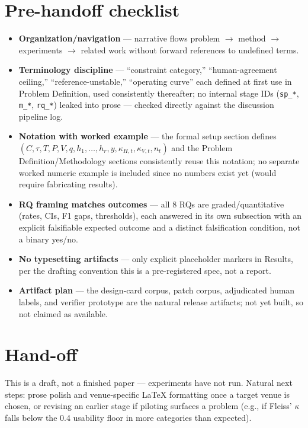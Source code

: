 \documentclass[11pt]{article}
\begin{document}
\section*{Pre-handoff checklist}
\begin{itemize}[leftmargin=1.4em]
\item \textbf{Organization/navigation} --- narrative flows problem $\to$ method $\to$ experiments $\to$ related work without forward references to undefined terms.
\item \textbf{Terminology discipline} --- ``constraint category,'' ``human-agreement ceiling,'' ``reference-unstable,'' ``operating curve'' each defined at first use in Problem Definition, used consistently thereafter; no internal stage IDs (\texttt{sp\_*}, \texttt{m\_*}, \texttt{rq\_*}) leaked into prose --- checked directly against the discussion pipeline log.
\item \textbf{Notation with worked example} --- the formal setup section defines $(C, \tau, T, P, V, q, h_1,\dots,h_r, y, \kappa_{H,t}, \kappa_{V,t}, n_t)$ and the Problem Definition/Methodology sections consistently reuse this notation; no separate worked numeric example is included since no numbers exist yet (would require fabricating results).
\item \textbf{RQ framing matches outcomes} --- all 8 RQs are graded/quantitative (rates, CIs, F1 gaps, thresholds), each answered in its own subsection with an explicit falsifiable expected outcome and a distinct falsification condition, not a binary yes/no.
\item \textbf{No typesetting artifacts} --- only explicit placeholder markers in Results, per the drafting convention this is a pre-registered spec, not a report.
\item \textbf{Artifact plan} --- the design-card corpus, patch corpus, adjudicated human labels, and verifier prototype are the natural release artifacts; not yet built, so not claimed as available.
\end{itemize}

\section*{Hand-off}
This is a draft, not a finished paper --- experiments have not run. Natural next steps: prose polish and venue-specific LaTeX formatting once a target venue is chosen, or revising an earlier stage if piloting surfaces a problem (e.g., if Fleiss' $\kappa$ falls below the 0.4 usability floor in more categories than expected).
\end{document}
